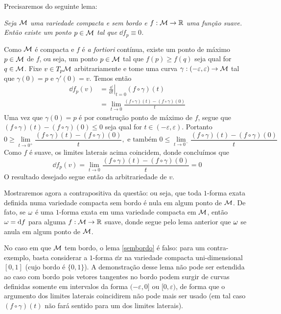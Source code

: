 \begin{dem}
Precisaremos do seguinte lema:
\begin{lema}\label{sembordo}
\textit{
Seja $\mathcal{M}$ uma variedade compacta e sem bordo e $f: \mathcal{M} \to \mathbb{R}$ uma função suave. Então existe um ponto $p \in \mathcal{M}$ tal que $\dd f_p \equiv 0$.
}
\end{lema}
\begin{demm}
Como $\mathcal{M}$ é compacta e $f$ é \emph{a fortiori} contínua, existe um ponto de máximo $p \in \mathcal{M}$ de $f$, ou seja, um ponto $p \in \mathcal{M}$ tal que $f(p) \geq f(q)$ seja qual for $q \in \mathcal{M}$. Fixe $v \in T_p \mathcal{M}$ arbitrariamente e tome uma curva $\gamma: (-\varepsilon, \varepsilon) \to \mathcal{M}$ tal que $\gamma(0) = p$ e $\gamma'(0) = v$. Temos então
\begin{align*}
\dd f_p(v) &= \left.\frac{\dd }{\dd t}\right\vert_{t = 0} (f \circ \gamma)(t) \\
&= \lim_{t \to 0} \frac{(f \circ \gamma)(t) - (f \circ \gamma)(0)}{t}
\end{align*} 
Uma vez que $\gamma(0) = p$ é por construção ponto de máximo de $f$, segue que $(f \circ \gamma)(t) - (f \circ \gamma)(0) \leq 0$ seja qual for $t \in (-\varepsilon, \varepsilon)$. Portanto
\[
0 \geq \lim_{t \to 0^{+}} \frac{(f \circ \gamma)(t) - (f \circ \gamma)(0)}{t}, \text{ e também } 0 \leq \lim_{t \to 0^{-}} \frac{(f \circ \gamma)(t) - (f \circ \gamma)(0)}{t}
\]
Como $f$ é suave, os limites laterais acima coincidem, donde concluímos que
\[
\dd f_p(v) = \lim_{t \to 0} \frac{(f \circ \gamma)(t) - (f \circ \gamma)(0)}{t} = 0
\]
O resultado desejado segue então da arbitrariedade de $v$.
\end{demm}
Mostraremos agora a contrapositiva da questão: ou seja, que toda $1$-forma exata definida numa variedade compacta sem bordo é nula em algum ponto de $\mathcal{M}$. De fato, se $\omega$ é uma $1$-forma exata em uma variedade compacta em $\mathcal{M}$, então $\omega = \mathrm{d} f$ para alguma $f: \mathcal{M} \to \mathbb{R}$ suave, donde segue pelo lema anterior que $\omega$ se anula em algum ponto de $\mathcal{M}$.
\end{dem}
\begin{oobs}
No caso em que $\mathcal{M}$ tem bordo, o lema \cref{sembordo} é falso: para um contra-exemplo, basta considerar a $1$-forma $\dd x$ na variedade compacta uni-dimensional $[0, 1]$ (cujo bordo é $\{0, 1\}$). A demonstração desse lema não pode ser estendida ao caso com bordo pois vetores tangentes no bordo podem surgir de curvas definidas somente em intervalos da forma $(-\varepsilon, 0]$ ou $[0, \varepsilon)$, de forma que o argumento dos limites laterais coincidirem não pode mais ser usado (em tal caso $(f \circ \gamma)(t)$ não fará sentido para um dos limites laterais).
\end{oobs}
